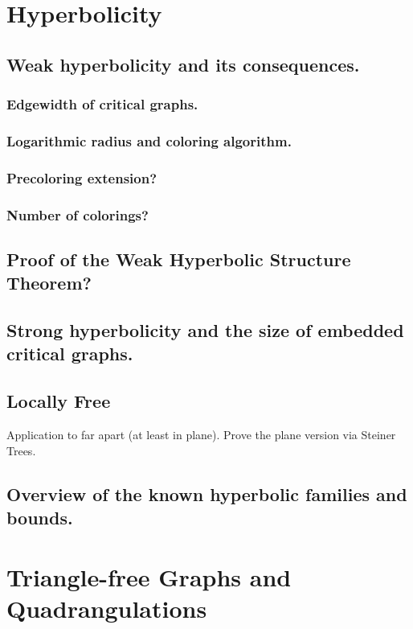 \documentclass[12pt,twoside,openright,a4paper]{book}
\begin{document}
\chapter{Hyperbolicity}


\section{Weak hyperbolicity and its consequences.}

\subsection{Edgewidth of critical graphs. }
\subsection{Logarithmic radius and coloring algorithm.}
\subsection{Precoloring extension?}
\subsection{Number of colorings? }

\section{Proof of the Weak Hyperbolic Structure Theorem?}

\section{Strong hyperbolicity and the size of embedded critical graphs.}

\section{Locally Free}

Application to far apart (at least in plane). Prove the plane version via Steiner Trees.

\section{Overview of the known hyperbolic families and bounds.}


\chapter{Triangle-free Graphs and Quadrangulations}
\end{document}
